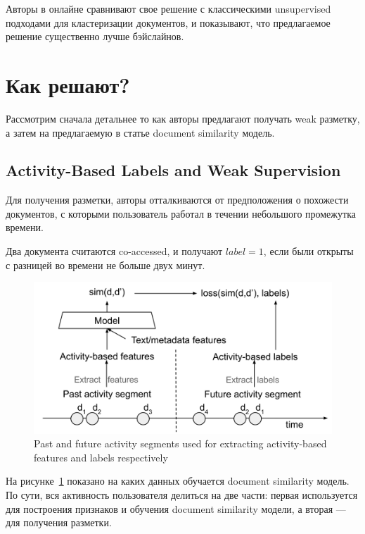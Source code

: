 Авторы в онлайне сравнивают свое решение с классическими unsupervised подходами для кластеризации документов, и показывают, что предлагаемое решение существенно лучше бэйслайнов.

\section*{Как решают?}

Рассмотрим сначала детальнее то как авторы предлагают получать weak разметку, а затем на предлагаемую в статье document similarity модель.

\subsection*{Activity-Based Labels and Weak Supervision}

Для получения разметки, авторы отталкиваются от предположения о похожести документов, с которыми пользователь работал в течении небольшого промежутка времени.

Два документа считаются co-accessed, и получают $label = 1$, если были открыты с разницей во времени не больше двух минут. \\

\begin{figure}
    \includegraphics[width=0.99\linewidth]{images/dsm_labels.png}
    \caption{\footnotesize{Past and future activity segments used for extracting activity-based features and labels respectively}}
    \label{fig:dsm_labels}
\end{figure}
На рисунке~\ref{fig:dsm_labels} показано на каких данных обучается document similarity модель. \\

По сути, вся активность пользователя делиться на две части: первая используется для построения признаков и обучения document similarity модели, а вторая --- для получения разметки. \\

